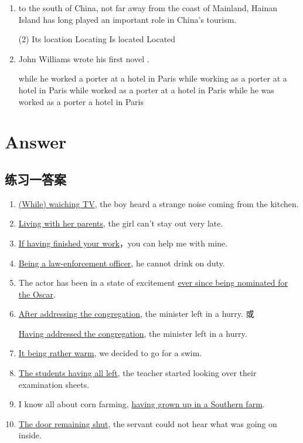 \begin{enumerate}
\item \ttu to the south of China, not far away from the coast of Mainland, Hainan Island has long played an important role in China's tourism.
\begin{tasks}(2)
  \task Its location
  \task Locating
  \task Is located
  \task Located
\end{tasks}

\item John Williams wrote his first novel \ttu.
\begin{tasks}
  \task while he worked a porter at a hotel in Paris
  \task while working as a porter at a hotel in Paris
  \task while worked as a porter at a hotel in Paris
  \task while he was worked as a porter a hotel in Paris
\end{tasks}

\end{enumerate}

\section{Answer}

\subsection{练习一答案}
\begin{enumerate}
\item \ul{(While) waiching TV}, the boy heard a strange noise coming from the
  kitchen.

\item \ul{Living with her parents}, the girl can't stay out very late.

\item \ul{If having finished your work}，you can help me with mine.

\item \ul{Being a law-enforcement officer}, he cannot drink on duty.

\item The actor has been in a state of excitement \ul{ever since being
    nominated for the Oscar}.

\item \ul{After addressing the congregation}, the minister left in a hurry. 或

  \ul{Having addressed the congregation}, the minister left in a hurry.
\item \ul{It being rather warm}, we decided to go for a swim.

\item \ul{The students having all left}, the teacher started looking over their
  examination sheets.

\item I know all about corn farming, \ul{having grown up in a Southern farm}.

\item \ul{The door remaining shut}, the servant could not hear what was going on
  inside.

\end{enumerate}

